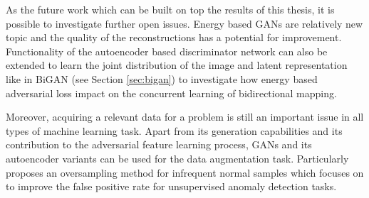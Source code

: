 As the future work which can be built on top the results of this thesis, it is possible to investigate 
further open issues. Energy based GANs are relatively new topic and the 
quality of the reconstructions has a potential for improvement. Functionality of the autoencoder based 
discriminator network can also be extended to learn the joint distribution of the image and latent 
representation like in BiGAN (see Section \ref{sec:bigan}) to investigate how energy based adversarial 
loss impact on the concurrent learning of bidirectional mapping. 

Moreover, acquiring a relevant data for a problem is still an important issue in all types of machine 
learning task. Apart from its generation capabilities and its contribution to the adversarial feature 
learning process, GANs and its autoencoder variants can be used for the data augmentation task.
Particularly \cite{DBLP:journals/corr/abs-1808-07632} proposes an oversampling method for infrequent 
normal samples which focuses on to improve the false positive rate for unsupervised anomaly detection tasks. 

\endgroup
 
